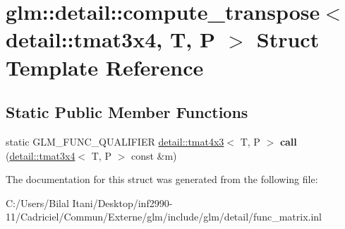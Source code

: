 \hypertarget{structglm_1_1detail_1_1compute__transpose_3_01detail_1_1tmat3x4_00_01_t_00_01_p_01_4}{}\section{glm\+:\+:detail\+:\+:compute\+\_\+transpose$<$ detail\+:\+:tmat3x4, T, P $>$ Struct Template Reference}
\label{structglm_1_1detail_1_1compute__transpose_3_01detail_1_1tmat3x4_00_01_t_00_01_p_01_4}
\subsection*{Static Public Member Functions}
\begin{DoxyCompactItemize}
\item 
static G\+L\+M\+\_\+\+F\+U\+N\+C\+\_\+\+Q\+U\+A\+L\+I\+F\+I\+ER \hyperlink{structglm_1_1detail_1_1tmat4x3}{detail\+::tmat4x3}$<$ T, P $>$ {\bfseries call} (\hyperlink{structglm_1_1detail_1_1tmat3x4}{detail\+::tmat3x4}$<$ T, P $>$ const \&m)\hypertarget{structglm_1_1detail_1_1compute__transpose_3_01detail_1_1tmat3x4_00_01_t_00_01_p_01_4_a1cd1f07ec6c02b790e15ae86c40fb5b0}{}\label{structglm_1_1detail_1_1compute__transpose_3_01detail_1_1tmat3x4_00_01_t_00_01_p_01_4_a1cd1f07ec6c02b790e15ae86c40fb5b0}

\end{DoxyCompactItemize}


The documentation for this struct was generated from the following file\+:\begin{DoxyCompactItemize}
\item 
C\+:/\+Users/\+Bilal Itani/\+Desktop/inf2990-\/11/\+Cadriciel/\+Commun/\+Externe/glm/include/glm/detail/func\+\_\+matrix.\+inl\end{DoxyCompactItemize}
